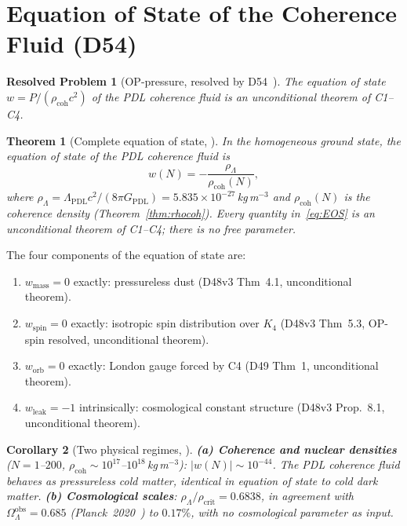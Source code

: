 \documentclass[11pt,a4paper]{article}
\newtheorem{resolvedproblem}{Resolved Problem}
\theoremstyle{plain}
\newtheorem{theorem}{Theorem}[section]
\newtheorem{corollary}[theorem]{Corollary}
\theoremstyle{definition}
\theoremstyle{remark}
\newcommand{\rhocoh}{\rho_{\mathrm{coh}}}
\begin{document}
\section{Equation of State of the Coherence Fluid (D54)}
\label{sec:EOS}

\begin{resolvedproblem}[OP-pressure, resolved by D54~{\cite{D54}}]
\label{rp:pressure}
The equation of state $w = P/(\rhocoh c^2)$ of the PDL coherence fluid is an unconditional theorem of C1--C4.
\end{resolvedproblem}

\begin{theorem}[Complete equation of state, \cite{D54}]
\label{thm:EOS}
In the homogeneous ground state, the equation of state of the PDL coherence fluid is
\begin{equation}
w(N) = -\frac{\rho_\Lambda}{\rhocoh(N)},
\label{eq:EOS}
\end{equation}
where $\rho_\Lambda = \Lambda_{\mathrm{PDL}} c^2 / (8\pi G_{\mathrm{PDL}}) = 5.835\times 10^{-27}$\,kg\,m$^{-3}$ and $\rhocoh(N)$ is the coherence density (Theorem~\ref{thm:rhocoh}). Every quantity in~\eqref{eq:EOS} is an unconditional theorem of C1--C4; there is no free parameter.
\end{theorem}

The four components of the equation of state are:
\begin{enumerate}
\item $w_{\mathrm{mass}} = 0$ exactly: pressureless dust (D48v3 Thm~4.1, unconditional theorem).
\item $w_{\mathrm{spin}} = 0$ exactly: isotropic spin distribution over $K_4$ (D48v3 Thm~5.3, OP-spin resolved, unconditional theorem).
\item $w_{\mathrm{orb}} = 0$ exactly: London gauge forced by C4 (D49 Thm~1, unconditional theorem).
\item $w_{\mathrm{leak}} = -1$ intrinsically: cosmological constant structure (D48v3 Prop.~8.1, unconditional theorem).
\end{enumerate}

\begin{corollary}[Two physical regimes, \cite{D54}]
\label{cor:regimes}
\textbf{(a) Coherence and nuclear densities} ($N=1$--$200$, $\rhocoh \sim 10^{17}$--$10^{18}$\,kg\,m$^{-3}$): $|w(N)| \sim 10^{-44}$. The PDL coherence fluid behaves as pressureless cold matter, identical in equation of state to cold dark matter. \textbf{(b) Cosmological scales}: $\rho_\Lambda/\rho_{\mathrm{crit}} = 0.6838$, in agreement with $\Omega_\Lambda^{\mathrm{obs}} = 0.685$ (Planck~2020~\cite{Planck_2020}) to $0.17\%$, with no cosmological parameter as input.
\end{corollary}
\end{document}
